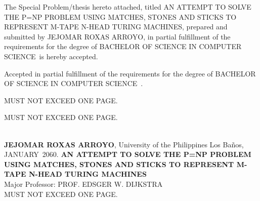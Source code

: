 \documentclass{icsthesis}
\renewcommand{\TITLE}{AN ATTEMPT TO SOLVE THE P=NP PROBLEM USING MATCHES, STONES AND STICKS TO REPRESENT M-TAPE N-HEAD TURING MACHINES}
\renewcommand{\AUTHOR}{JEJOMAR ROXAS ARROYO}
\renewcommand{\DEGREE}{BACHELOR OF SCIENCE IN COMPUTER SCIENCE}
\renewcommand{\MONTH}{JANUARY}
\renewcommand{\YEAR}{2060}
\begin{document}
	
	\begin{frontmatter}
		\maketitle
				
		\begin{approvalpage}
			The Special Problem/thesis hereto attached, titled \TITLE , prepared and submitted by \AUTHOR , in partial fulfillment of the requirements for the degree of \DEGREE\ is hereby accepted.
			

            
            
			Accepted in partial fulfillment of the requirements for the degree of \DEGREE\ .\\ 
		
        
        
        \end{approvalpage}
		
		\begin{biosketch}
			\lipsum[4] %
			
			MUST NOT EXCEED ONE PAGE.		
			
			\addauthorsignaturefield
		\end{biosketch}	
		
		\begin{acknowledgement}
			\lipsum[4]
			\lipsum[4]
			\lipsum[4]
			MUST NOT EXCEED ONE PAGE.
		\end{acknowledgement}
		
		\maketableofcontents
		
		\makelistoftables

		\makelistoffigures
	
		
		\begin{abstractwithpageno}	
		\\
		\textbf{\AUTHOR}, University of the Philippines Los Ba\~{n}os, \MONTH\ \YEAR. \textbf{\TITLE}
		\\Major Professor: PROF. EDSGER W. DIJKSTRA\\
			
			\lipsum[4]MUST NOT EXCEED ONE PAGE.
		\end{abstractwithpageno}

	\end{frontmatter}
	
\end{document}
